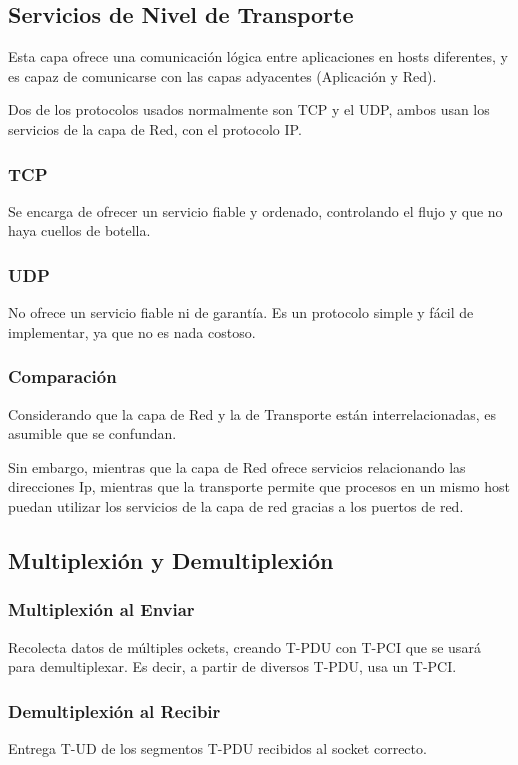 \subsection{Servicios de Nivel de Transporte}
\noindent Esta capa ofrece una comunicación lógica entre aplicaciones en hosts diferentes, y es capaz de comunicarse con las capas adyacentes (Aplicación y Red). \par \noindent Dos de los protocolos usados normalmente son TCP y el UDP, ambos usan los servicios de la capa de Red, con el protocolo IP.
\subsubsection{TCP}
\noindent Se encarga de ofrecer un servicio fiable y ordenado, controlando el flujo y que no haya cuellos de botella.
\subsubsection{UDP}
\noindent No ofrece un servicio fiable ni de garantía. Es un protocolo simple y fácil de implementar, ya que no es nada costoso.
\subsubsection{Comparación}
\noindent Considerando que la capa de Red y la de Transporte están interrelacionadas, es asumible que se confundan. \par \noindent Sin embargo, mientras que la capa de Red ofrece servicios relacionando las direcciones Ip, mientras que la transporte permite que procesos en un mismo host puedan utilizar los servicios de la capa de red gracias a los puertos de red.
\subsection{Multiplexión y Demultiplexión}
\subsubsection{Multiplexión al Enviar}
\noindent Recolecta datos de múltiples ockets, creando T-PDU con T-PCI que se usará para demultiplexar. Es decir, a partir de diversos T-PDU, usa un T-PCI.
\subsubsection{Demultiplexión al Recibir}
\noindent Entrega T-UD de los segmentos T-PDU recibidos al socket correcto.
